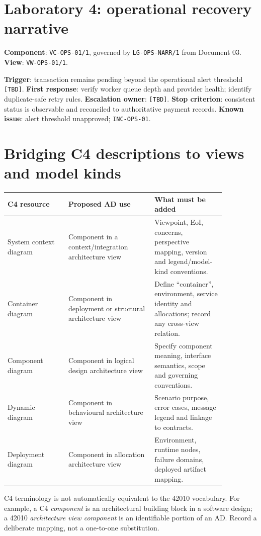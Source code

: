 \documentclass[11pt,letterpaper]{article}
\begin{document}
\section{Laboratory 4: operational recovery narrative}
\begin{Worked}\textbf{Component}: \texttt{VC-OPS-01/1}, governed by \texttt{LG-OPS-NARR/1} from Document 03. \textbf{View}: \texttt{VW-OPS-01/1}.\par
\textbf{Trigger}: transaction remains pending beyond the operational alert threshold \texttt{[TBD]}. \textbf{First response}: verify worker queue depth and provider health; identify duplicate-safe retry rules. \textbf{Escalation owner}: \texttt{[TBD]}. \textbf{Stop criterion}: consistent status is observable and reconciled to authoritative payment records. \textbf{Known issue}: alert threshold unapproved; \texttt{INC-OPS-01}.\end{Worked}
\section{Bridging C4 descriptions to views and model kinds}
\begin{longtable}{p{0.24\linewidth}p{0.34\linewidth}p{0.28\linewidth}}\toprule\textbf{C4 resource}&\textbf{Proposed AD use}&\textbf{What must be added}\\\midrule\endhead
System context diagram&Component in a context/integration architecture view&Viewpoint, EoI, concerns, perspective mapping, version and legend/model-kind conventions.\\
Container diagram&Component in deployment or structural architecture view&Define ``container'', environment, service identity and allocations; record any cross-view relation.\\
Component diagram&Component in logical design architecture view&Specify component meaning, interface semantics, scope and governing conventions.\\
Dynamic diagram&Component in behavioural architecture view&Scenario purpose, error cases, message legend and linkage to contracts.\\
Deployment diagram&Component in allocation architecture view&Environment, runtime nodes, failure domains, deployed artifact mapping.\\\bottomrule\end{longtable}
\begin{Guidance}C4 terminology is not automatically equivalent to the 42010 vocabulary. For example, a C4 \emph{component} is an architectural building block in a software design; a 42010 \emph{architecture view component} is an identifiable portion of an AD. Record a deliberate mapping, not a one-to-one substitution.\end{Guidance}
\end{document}
